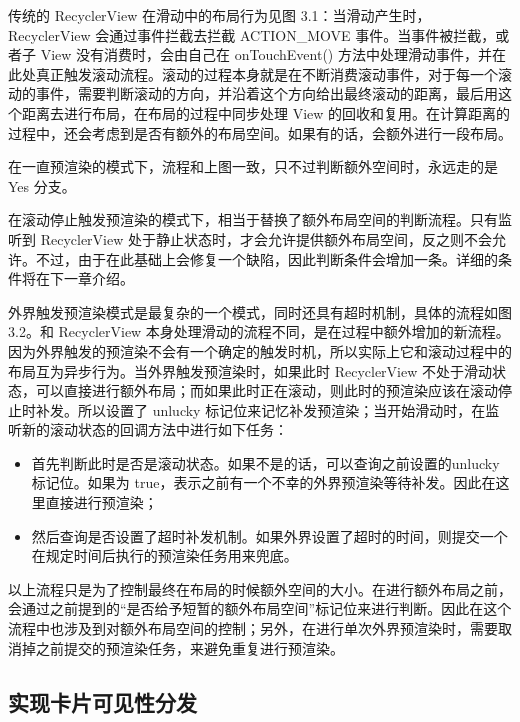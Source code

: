 传统的 RecyclerView 在滑动中的布局行为见图 3.1：当滑动产生时，RecyclerView 会通过事件拦截去拦截 ACTION\_MOVE 事件。当事件被拦截，或者子 View 没有消费时，会由自己在 onTouchEvent() 方法中处理滑动事件，并在此处真正触发滚动流程。滚动的过程本身就是在不断消费滚动事件，对于每一个滚动的事件，需要判断滚动的方向，并沿着这个方向给出最终滚动的距离，最后用这个距离去进行布局，在布局的过程中同步处理 View 的回收和复用。在计算距离的过程中，还会考虑到是否有额外的布局空间。如果有的话，会额外进行一段布局。



在一直预渲染的模式下，流程和上图一致，只不过判断额外空间时，永远走的是 Yes 分支。

在滚动停止触发预渲染的模式下，相当于替换了额外布局空间的判断流程。只有监听到 RecyclerView 处于静止状态时，才会允许提供额外布局空间，反之则不会允许。不过，由于在此基础上会修复一个缺陷，因此判断条件会增加一条。详细的条件将在下一章介绍。

外界触发预渲染模式是最复杂的一个模式，同时还具有超时机制，具体的流程如图 3.2。和 RecyclerView 本身处理滑动的流程不同，是在过程中额外增加的新流程。因为外界触发的预渲染不会有一个确定的触发时机，所以实际上它和滚动过程中的布局互为异步行为。当外界触发预渲染时，如果此时 RecyclerView 不处于滑动状态，可以直接进行额外布局；而如果此时正在滚动，则此时的预渲染应该在滚动停止时补发。所以设置了 unlucky 标记位来记忆补发预渲染；当开始滑动时，在监听新的滚动状态的回调方法中进行如下任务：



\begin{itemize}
    \item 首先判断此时是否是滚动状态。如果不是的话，可以查询之前设置的unlucky 标记位。如果为 true，表示之前有一个不幸的外界预渲染等待补发。因此在这里直接进行预渲染；
    \item 然后查询是否设置了超时补发机制。如果外界设置了超时的时间，则提交一个在规定时间后执行的预渲染任务用来兜底。
\end{itemize}

以上流程只是为了控制最终在布局的时候额外空间的大小。在进行额外布局之前，会通过之前提到的“是否给予短暂的额外布局空间”标记位来进行判断。因此在这个流程中也涉及到对额外布局空间的控制；另外，在进行单次外界预渲染时，需要取消掉之前提交的预渲染任务，来避免重复进行预渲染。


\subsection{实现卡片可见性分发}

